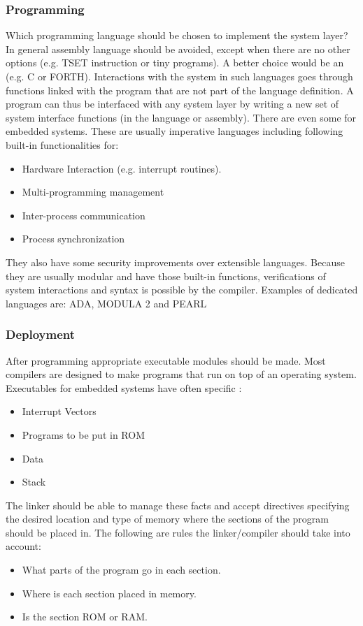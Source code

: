 \subsubsection{Programming}
Which  programming language should be chosen to implement the system layer? 
In general assembly language should be avoided, except when there are no other options (e.g. TSET instruction or tiny programs).
A better choice would be an  (e.g. C or FORTH).
Interactions with the system in such languages goes through functions linked with the program that are not part of the language definition. 
A program can thus be interfaced with any system layer by writing a new set of system interface functions (in the language or assembly).
There are even some  for embedded systems. 
These are usually imperative languages including following built-in functionalities for:
\begin{itemize}
	\item Hardware Interaction (e.g. interrupt routines).
	\item Multi-programming management
	\item Inter-process communication
	\item Process synchronization
\end{itemize}
They also have some security improvements over extensible languages.
Because they are usually modular and have those built-in functions, verifications of system interactions and syntax is possible by the compiler.
Examples of dedicated languages are: ADA, MODULA 2 and PEARL

\subsubsection{Deployment}
After programming appropriate executable modules should be made.
Most compilers are designed to make programs that run on top of an operating system.
Executables for embedded systems have often specific :
\begin{itemize}
	\item Interrupt Vectors 
	\item Programs to be put in ROM
	\item Data 
	\item Stack
\end{itemize}
The linker should be able to manage these facts and accept directives specifying the desired location and type of memory where the sections of the program should be placed in. 
The following are rules the linker/compiler should take into account:
\begin{itemize}
	\item What parts of the program go in each section. 
	\item Where is each section placed in memory.
	\item Is the section ROM or RAM.
\end{itemize}

